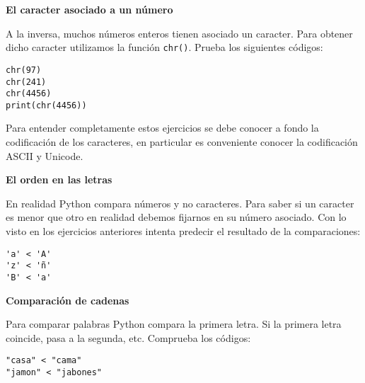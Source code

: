 \documentclass[a4paper, 11pt]{scrartcl}
\newenvironment{code}{\begin{tcolorbox}[colback=red!2!white]}{\end{tcolorbox}}
\begin{document}
\noindent\textbf{\sffamily \dag{}  El caracter asociado a un número}

A la inversa, muchos números enteros tienen asociado un caracter. Para obtener dicho caracter utilizamos la función \verb|chr()|. Prueba los siguientes códigos:

\smallskip

\begin{code}

\begin{verbatim}
chr(97)
chr(241)
chr(4456)
print(chr(4456))
\end{verbatim}

\end{code}

Para entender completamente estos ejercicios se debe conocer a fondo la codificación de los caracteres, en particular es conveniente conocer la codificación ASCII y Unicode.







\noindent\textbf{\sffamily  \dag{} El orden en las letras}

En realidad Python compara números y no caracteres. Para saber si un caracter es menor que otro en realidad debemos fijarnos en su número asociado. Con lo visto en los ejercicios anteriores intenta predecir el resultado de la comparaciones:

\smallskip

\begin{code}

\begin{verbatim}
'a' < 'A'
'z' < 'ñ'
'B' < 'a'
\end{verbatim}

\end{code}






\noindent\textbf{\sffamily \dag{} Comparación de cadenas}

 Para comparar palabras Python compara la primera letra. Si la primera letra coincide, pasa a la segunda, etc. Comprueba los códigos:



\smallskip

\begin{code}

\begin{verbatim}
"casa" < "cama"
"jamon" < "jabones"
\end{verbatim}

\end{code}
\end{document}
